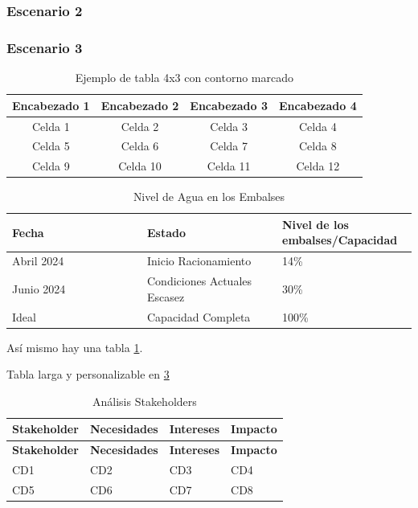 \documentclass{article}
\begin{document}
\subsubsection{Escenario 2}

\subsubsection{Escenario 3}


\renewcommand{\tablename}{Tabla}
\begin{table}[htbp]
  \centering
  \caption{Ejemplo de tabla 4x3 con contorno marcado \label{tab:Prueba}}
  \begin{tabular}{|c|c|c|c|} %
    \hline
    Encabezado 1 & Encabezado 2 & Encabezado 3 & Encabezado 4 \\
    \hline
    Celda 1 & Celda 2 & Celda 3 & Celda 4 \\
    \hline
    Celda 5 & Celda 6 & Celda 7 & Celda 8 \\
    \hline
    Celda 9 & Celda 10 & Celda 11 & Celda 12 \\
    \hline
  \end{tabular}
\end{table}

\begin{table}[H]
\centering
\caption{Nivel de Agua en los Embalses}
\label{tab:NivelAgua}
\begin{tabular}{|p{0.333\linewidth}|p{0.333\linewidth}|p{0.333\linewidth}|}
\hline
\textbf{Fecha} & \textbf{Estado} & \textbf{Nivel de los embalses/Capacidad} \\
\hline
Abril 2024 & Inicio Racionamiento & 14\% \\
\hline
Junio 2024 & Condiciones Actuales Escasez & 30\% \\
\hline
Ideal & Capacidad Completa & 100\% \\
\hline
\end{tabular}
\end{table}

Así mismo hay una tabla \ref{tab:Prueba}.

Tabla larga y personalizable en \ref{tab:anaTab}

\renewcommand{\tablename}{Tabla}
\begin{longtable}{|p{3.5cm}|p{3cm}|p{3cm}|p{5cm}|} %
  \caption{Análisis Stakeholders\label{tab:anaTab}} \\
  \hline
  \textbf{Stakeholder} & \textbf{Necesidades} & \textbf{Intereses} & \textbf{Impacto} \\
  \hline
  \endfirsthead %
  \hline
  \textbf{Stakeholder} & \textbf{Necesidades} & \textbf{Intereses} & \textbf{Impacto} \\
  \hline
  \endhead %
  CD1 & CD2 & CD3 & CD4 \\
  \hline
  CD5 & CD6 & CD7 & CD8 \\
  \hline
\end{longtable}
\end{document}
